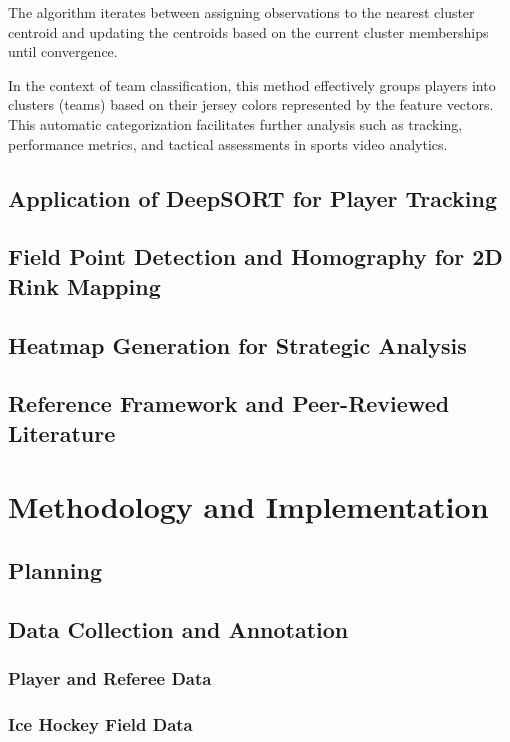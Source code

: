 \documentclass[12pt, letterpaper]{article}
\begin{document}
{\begin{spacing}{1.2}

The algorithm iterates between assigning observations to the nearest cluster centroid and updating the centroids based on the current cluster memberships until convergence.

In the context of team classification, this method effectively groups players into clusters (teams) based on their jersey colors represented by the feature vectors. This automatic categorization facilitates further analysis such as tracking, performance metrics, and tactical assessments in sports video analytics.


\end{spacing}
}


\subsection{Application of DeepSORT for Player Tracking}
\subsection{Field Point Detection and Homography for 2D Rink Mapping}
\subsection{Heatmap Generation for Strategic Analysis}
\subsection{Reference Framework and Peer-Reviewed Literature}
\newpage

\section{Methodology and Implementation}

\subsection{Planning}
\subsection{Data Collection and Annotation}
\subsubsection{Player and Referee Data}
\subsubsection{Ice Hockey Field Data}
\end{document}
